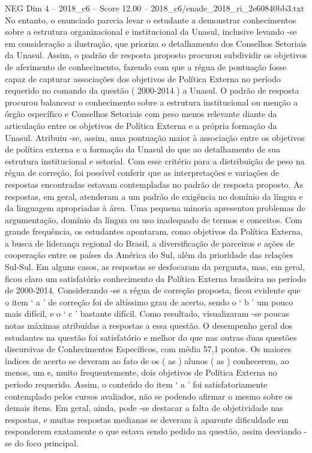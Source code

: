 \begin{textsample}{NEG Dim 4 – 2018\_c6 – Score 12.00 – 2018\_c6/enade\_2018\_ri\_2e60840bb3.txt}
No entanto, o enunciado parecia levar o estudante a demonstrar conhecimentos sobre a estrutura organizacional e institucional da Unasul, inclusive levando -se em consideração a ilustração, que prioriza o detalhamento dos Conselhos Setoriais da Unasul.
Assim, o padrão de resposta proposto procurou subdividir os objetivos de aferimento de conhecimento, fazendo com que a régua de pontuação fosse capaz de capturar associações dos objetivos de Política Externa no período requerido no comando da questão ( 2000-2014 ) a Unasul.
O padrão de resposta procurou balancear o conhecimento sobre a estrutura institucional ou menção a órgão específico e Conselhos Setoriais com peso menos relevante diante da articulação entre os objetivos de Política Externa e a própria formação da Unasul.
Atribuiu -se, assim, uma pontuação maior à associação entre os objetivos de política externa e a formação da Unasul do que ao detalhamento de sua estrutura institucional e setorial.
Com esse critério para a distribuição de peso na régua de correção, foi possível conferir que as interpretações e variações de respostas encontradas estavam contempladas no padrão de resposta proposto.
As respostas, em geral, atenderam a um padrão de exigência no domínio da língua e da linguagem apropriadas à área.
Uma pequena minoria apresentou problemas de argumentação, domínio da língua ou uso inadequado de termos e conceitos.
Com grande frequência, os estudantes apontaram, como objetivos da Política Externa, a busca de liderança regional do Brasil, a diversificação de parceiros e ações de cooperação entre os países da América do Sul, além da prioridade das relações Sul-Sul.
Em alguns casos, as respostas se desfocaram da pergunta, mas, em geral, ficou claro um satisfatório conhecimento da Política Externa brasileira no período de 2000-2014.
Considerando -se a régua de correção proposta, ficou evidente que o item ‘ a ’ de correção foi de altíssimo grau de acerto, sendo o ‘ b ’ um pouco mais difícil, e o ‘ c ’ bastante difícil.
Como resultado, visualizaram -se poucas notas máximas atribuídas a respostas a essa questão.
O desempenho geral dos estudantes na questão foi satisfatório e melhor do que nas outras duas questões discursivas de Conhecimentos Específicos, com média 57,1 pontos.
Os maiores índices de acerto se deveram ao fato de os ( as ) alunos ( as ) conhecerem, ao menos, um e, muito frequentemente, dois objetivos de Política Externa no período requerido.
Assim, o conteúdo do item ‘ a ’ foi satisfatoriamente contemplado pelos cursos avaliados, não se podendo afirmar o mesmo sobre os demais itens.
Em geral, ainda, pode -se destacar a falta de objetividade nas respostas, e muitas respostas medianas se deveram à aparente dificuldade em responderem exatamente o que estava sendo pedido na questão, assim desviando -se do foco principal.

\end{textsample}
